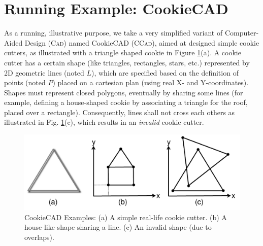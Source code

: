 \section{Running Example: CookieCAD}
\label{sec:Examples}

As a running, illustrative purpose, we take a very simplified variant of 
Computer-Aided Design (\textsc{Cad}) named CookieCAD (\textsc{CCad}), aimed at 
designed simple cookie cutters, as illustrated with a triangle shaped cookie in 
Figure \ref{fig:CookieCAD}(a). A cookie cutter has a certain shape (like 
triangles, rectangles, stars, etc.) represented by 2D geometric lines (noted 
$L$), which are specified based on the definition of points (noted $P$) placed 
on a cartesian plan (using real X- and Y-coordinates). Shapes must represent 
closed polygons, eventually by sharing some lines (for example, defining a 
house-shaped cookie by associating a triangle for the roof, placed over a 
rectangle). Consequently, lines shall not cross each others as illustrated in 
Fig. \ref{fig:CookieCAD}(c), which results in an \emph{invalid} cookie cutter.

\begin{figure}[t]
   \centering
   \includegraphics[width=\columnwidth]{CookieCAD.pdf}
   \caption{CookieCAD Examples: (a) A simple real-life cookie cutter. (b) A 
house-like shape sharing a line. (c) An invalid shape (due to overlaps).}%
 
   \label{fig:CookieCAD}
\end{figure}


